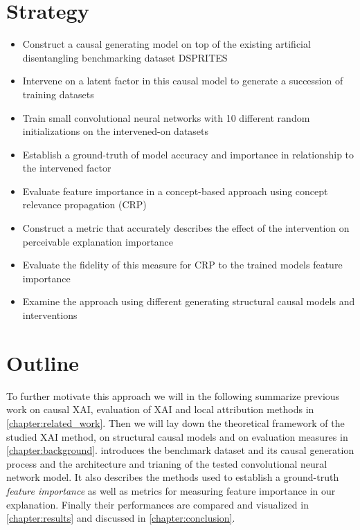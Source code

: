 \section{Strategy}
\begin{itemize}
    \item Construct a causal generating model on top of the existing artificial disentangling benchmarking dataset DSPRITES
    \item Intervene on a latent factor in this causal model to generate a succession of training datasets
    \item Train small convolutional neural networks with 10 different random initializations on the intervened-on datasets
    \item Establish a ground-truth of model accuracy and importance in relationship to the intervened factor
    \item Evaluate feature importance in a concept-based approach using concept relevance propagation (CRP)
    \item Construct a metric that accurately describes the effect of the intervention on perceivable explanation importance 
    \item Evaluate the fidelity of this measure for CRP to the trained models feature importance
    \item Examine the approach using different generating structural causal models and interventions
\end{itemize}

\section{Outline}
To further motivate this approach we will in the following summarize previous work on causal XAI, evaluation of XAI and local attribution methods in \cref{chapter:related_work}. Then we will lay down the theoretical framework of the studied XAI method, on structural causal models and on evaluation measures in \cref{chapter:background}.  introduces the benchmark dataset and its causal generation process and the architecture and trianing of the tested convolutional neural network model. It also describes the methods used to establish a ground-truth \textit{feature importance} as well as metrics for measuring feature importance in our explanation. Finally their performances are compared and visualized in \cref{chapter:results} and discussed in \cref{chapter:conclusion}.
